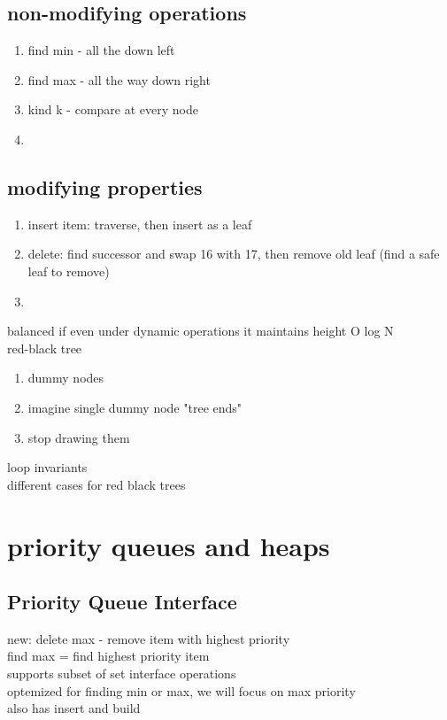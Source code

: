 \documentclass{article}
\begin{document}
\subsection{non-modifying operations}
\begin{enumerate}
    \item find min - all the down left
    \item find max - all the way down right 
    \item kind k - compare at every node
    \item 
\end{enumerate}
\subsection{modifying properties}
\begin{enumerate}
    \item insert item: traverse, then insert as a leaf
    \item delete: find successor and swap 16 with 17, then remove old leaf (find a safe leaf to remove)
    \item 
\end{enumerate}
balanced if even under dynamic operations it maintains height O log N\\
red-black tree\\
\begin{enumerate}
    \item dummy nodes
    \item imagine single dummy node "tree ends"
    \item stop drawing them
\end{enumerate}
loop invariants\\
different cases for red black trees\\
\section{priority queues and heaps}
\subsection{Priority Queue Interface}
new: delete max - remove item with highest priority\\
find max = find highest priority item\\
supports subset of set interface operations\\
optemized for finding min or max, we will focus on max priority\\
also has insert and build
\end{document}
